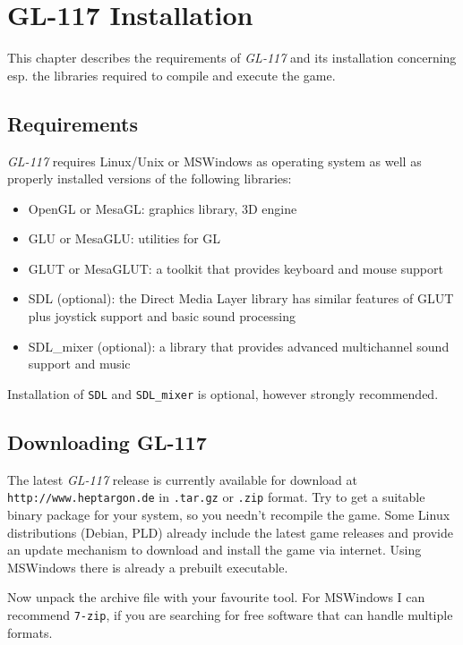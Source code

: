 \chapter{GL-117 Installation}
\label{chap:installation}

This chapter describes the requirements of \emph{GL-117} and its installation
concerning esp. the libraries required to compile and execute the game.

\section{Requirements}
\label{sec:requirements}

\emph{GL-117} requires Linux/Unix or MSWindows as operating system as well as
properly installed versions of the following libraries:
\begin{itemize}
\item{OpenGL or MesaGL: graphics library, 3D engine}
\item{GLU or MesaGLU: utilities for GL}
\item{GLUT or MesaGLUT: a toolkit that provides keyboard and mouse support}
\item{SDL (optional): the Direct Media Layer library has similar features of GLUT plus joystick
support and basic sound processing}
\item{SDL\_mixer (optional): a library that provides advanced multichannel sound
support and music}
\end{itemize}

Installation of \texttt{SDL} and \texttt{SDL\_mixer} is optional, however strongly recommended.

\section{Downloading GL-117}
\label{sec:downloading_gl117}

The latest \emph{GL-117} release is currently available for download at
\texttt{http://www.heptargon.de} in \texttt{.tar.gz} or \texttt{.zip} format.
Try to get a suitable binary package for your system, so you needn't recompile the game.
Some Linux distributions (Debian, PLD) already include the latest game releases and provide an update
mechanism to download and install the game via internet.
Using MSWindows there is already a prebuilt executable. 

Now unpack the archive file with your favourite tool.
For MSWindows I can recommend \texttt{7-zip}, if you are searching for free software that can handle multiple formats.

